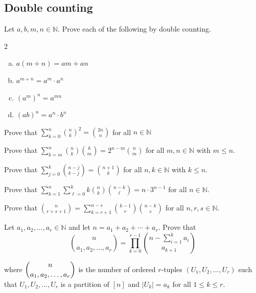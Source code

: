 \subsection*{Double counting}

\begin{chapex}
Let $a,b,m,n \in \mathbb{N}$. Prove each of the following by double counting.
\begin{multicols}{2}
\begin{enumerate}[(a)]
\item $a(m+n) = am + an$
\item $a^{m+n} = a^m \cdot a^n$
\item $(a^m)^n = a^{mn}$
\item $(ab)^n = a^n \cdot b^n$
\end{enumerate}
\end{multicols}
\end{chapex}

\begin{chapex}
Prove that $\displaystyle \sum_{k=0}^n \binom{n}{k}^2 = \binom{2n}{n}$ for all $n \in \mathbb{N}$
\end{chapex}

\begin{chapex}
Prove that $\displaystyle \sum_{k=m}^n \binom{n}{k} \binom{k}{m} = 2^{n-m} \binom{n}{m}$ for all $m,n \in \mathbb{N}$ with $m \le n$.
\end{chapex}

\begin{chapex}
Prove that $\displaystyle \sum_{j=0}^k \binom{n-j}{k-j} = \binom{n+1}{k}$ for all $n,k \in \mathbb{N}$ with $k \le n$.
\end{chapex}

\begin{chapex}
Prove that $\displaystyle \sum_{k=1}^n \sum_{\ell = 0}^k k \binom{n}{k} \binom{n-k}{\ell} = n \cdot 3^{n-1}$ for all $n \in \mathbb{N}$.
\end{chapex}

\begin{chapex}
Prove that $\displaystyle \binom{n}{r+s+1} = \sum_{k=r+1}^{n-s} \binom{k-1}{r} \binom{n-k}{s}$ for all $n,r,s \in \mathbb{N}$.
\end{chapex}

\begin{chapex}
Let $a_1,a_2,\dots,a_r \in \mathbb{N}$ and let $n = a_1 + a_2 + \cdots + a_r$. Prove that
\[
\binom{n}{a_1,a_2,\dots,a_r} = \prod_{k=0}^{r-1} \binom{n - \sum_{i=1}^k a_i}{a_{k+1}}
\]
\end{chapex}
where $\dbinom{n}{a_1,a_2,\dots,a_r}$ is the number of ordered $r$-tuples $(U_1, U_2, \dots, U_r)$ such that $U_1, U_2, \dots, U_r$ is a partition of $[n]$ and $|U_k| = a_k$ for all $1 \le k \le r$.

